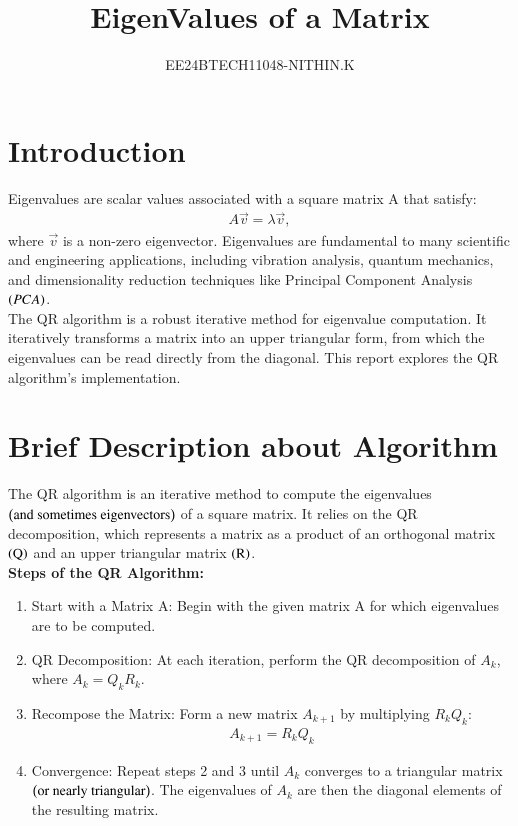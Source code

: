 \documentclass[journal]{IEEEtran}
\numberwithin{equation}{enumi}
\numberwithin{figure}{enumi}
\begin{document}


\title{EigenValues of a Matrix}
\author{EE24BTECH11048-NITHIN.K} 
{\let\newpage\relax\maketitle}
\section{\textbf{Introduction}}
Eigenvalues are scalar values associated with a square matrix A that satisfy:
\begin{align*}
A\vec{v} = \lambda \vec{v},
\end{align*}
where $\vec{v}$ is a non-zero eigenvector. Eigenvalues are fundamental to many scientific and engineering applications, including vibration analysis, quantum mechanics, and dimensionality reduction techniques like Principal Component Analysis $\left(PCA\right)$. \\
The QR algorithm is a robust iterative method for eigenvalue computation. It iteratively transforms a matrix into an upper triangular form, from which the eigenvalues can be read directly from the diagonal. This report explores the QR algorithm's implementation.

\section{\textbf{Brief Description about Algorithm}}
The QR algorithm is an iterative method to compute the eigenvalues $\left(\text{and sometimes eigenvectors}\right)$ of a square matrix. It relies on the QR decomposition, which represents a matrix as 
a product of an orthogonal matrix $\left(\text{Q}\right)$ and an upper triangular matrix $\left(\text{R}\right)$. \\
\textbf{Steps of the QR Algorithm:}
\begin{enumerate}
	\item Start with a Matrix A: Begin with the given matrix A for which eigenvalues are to be computed.
	\item QR Decomposition: At each iteration, perform the QR decomposition of $A_k$, where $A_k = Q_kR_k$.
	\item Recompose the Matrix: Form a new matrix $A_{k+1}$ by multiplying $R_kQ_k$:
		\begin{align*}
			A_{k+1} = R_kQ_k
		\end{align*}
	\item Convergence: Repeat steps 2 and 3 until $A_k$ converges to a triangular matrix $\left(\text{or nearly triangular}\right)$. The eigenvalues of $A_k$ are then the diagonal elements of the resulting matrix.
\end{enumerate}
\end{document}

